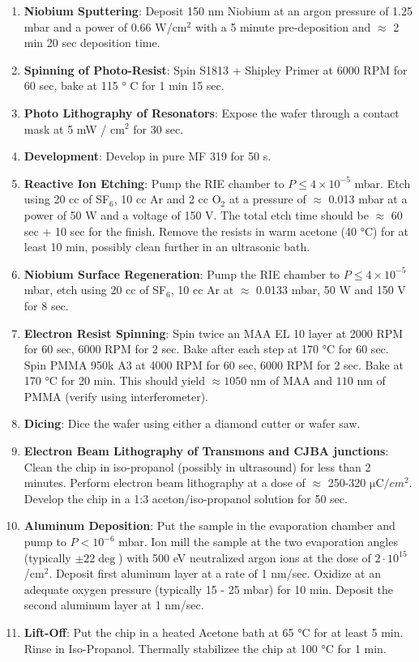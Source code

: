 \begin{enumerate}
\item \textbf{Niobium Sputtering}: Deposit 150 nm Niobium at an argon pressure of 1.25 mbar and a power of 0.66 W/cm$^2$ with a 5 minute pre-deposition and $\approx$ 2 min 20 sec deposition time.
\item \textbf{Spinning of Photo-Resist}: Spin S1813 + Shipley Primer at 6000 RPM for 60 sec, bake at 115 ° C for 1 min 15 sec.
\item \textbf{Photo Lithography of Resonators}: Expose the wafer through a contact mask at 5 mW / cm$^2$ for 30 sec.
\item \textbf{Development}: Develop in pure MF 319 for 50 s.
\item \textbf{Reactive Ion Etching}: Pump the RIE chamber to $P\le 4\times 10^{-5}$ mbar. Etch using 20 cc of SF$_6$, 10 cc Ar and 2 cc O$_2$ at a pressure of $\approx$ 0.013 mbar at a power of 50 W and a voltage of 150 V. The total etch time should be $\approx $ 60 sec + 10 sec for the finish. Remove the resists in warm acetone (40 °C) for at least 10 min, possibly clean further in an ultrasonic bath.
\item \textbf{Niobium Surface Regeneration}: Pump the RIE chamber  to $P\le 4\times 10^{-5}$ mbar, etch using 20 cc of SF$_6$, 10 cc Ar at $\approx$ 0.0133 mbar, 50 W and 150 V for 8 sec.
\item \textbf{Electron Resist Spinning}: Spin twice an MAA EL 10 layer at 2000 RPM for 60 sec, 6000 RPM for 2 sec. Bake after each step at 170 °C for 60 sec. Spin PMMA 950k A3 at 4000 RPM for 60 sec, 6000 RPM for 2 sec. Bake at 170 °C for 20 min. This should yield $\approx 1050$ nm of MAA and $110$ nm of PMMA (verify using interferometer).
\item \textbf{Dicing}: Dice the wafer using either a diamond cutter or wafer saw.
\item \textbf{Electron Beam Lithography of Transmons and CJBA junctions}: Clean the chip in iso-propanol (possibly in ultrasound) for less than 2 minutes. Perform electron beam lithography at a dose of $\approx$ 250-320 $\mathrm{\mu C}/cm^2$. Develop the chip in a 1:3 aceton/iso-propanol solution for 50 sec.
\item \textbf{Aluminum Deposition}: Put the sample in the evaporation chamber and pump to $P<10^{-6}$ mbar. Ion mill the sample at the two evaporation angles (typically $\pm 22\deg$) with 500 eV neutralized argon ions at the dose of $2\cdot 10^{15}$/cm$^2$. Deposit first aluminum layer at a rate of 1 nm/sec. Oxidize at an adequate oxygen pressure (typically 15 - 25 mbar) for 10 min. Deposit the second aluminum layer at 1 nm/sec.
\item \textbf{Lift-Off}: Put the chip in a heated Acetone bath at 65 °C for at least 5 min. Rinse in Iso-Propanol. Thermally stabilizee the chip at 100 °C for 1 min.

\end{enumerate}
